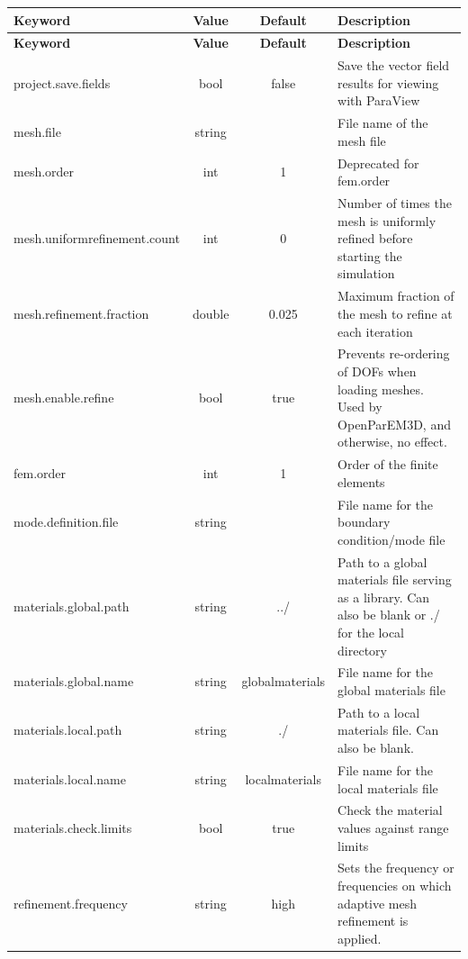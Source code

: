 \documentclass[titlepage]{article}
\renewcommand\_{\textunderscore\linebreak[1]}
\begin{document}
\tabcolsep=0.05cm
\small
\begin{longtable}[c]{|lccp{8cm}|}
    \hline
    \textbf{Keyword} & \textbf{Value} & \textbf{Default} & \textbf{Description} \\
    \hline
    \endfirsthead
    \hline
    \textbf{Keyword} & \textbf{Value} & \textbf{Default} & \textbf{Description} \\
    \hline
    \endhead
    project.save.fields          & bool   & false & Save the vector field results for viewing with ParaView \\
    mesh.file                    & string &       & File name of the mesh file \\
    mesh.order                   & int    & 1     & Deprecated for fem.order \\
    mesh.uniform\_refinement.count & int   & 0     & Number of times the mesh is uniformly refined before starting the simulation \\
    mesh.refinement.fraction     & double & 0.025 & Maximum fraction of the mesh to refine at each iteration \\
    mesh.enable.refine           & bool   & true  & Prevents re-ordering of DOFs when loading meshes.  Used by OpenParEM3D, and otherwise, no effect.  \\
    fem.order                    & int    & 1     & Order of the finite elements \\
    mode.definition.file         & string &       & File name for the boundary condition/mode file \\
    materials.global.path        & string & ../   & Path to a global materials file serving as a library.  Can also be blank or ./ for the local directory \\
    materials.global.name        & string & global\_materials & File name for the global materials file \\
    materials.local.path         & string & ./    & Path to a local materials file. Can also be blank. \\
    materials.local.name         & string & local\_materials & File name for the local materials file \\
    materials.check.limits       & bool   & true  & Check the material values against range limits \\
    refinement.frequency         & string & high  & Sets the frequency or frequencies on which adaptive mesh refinement is applied.
                                                   

\end{longtable}
\end{document}
